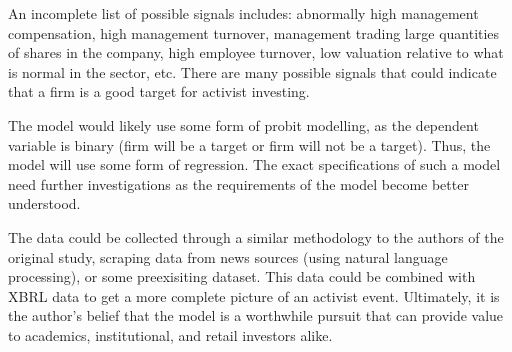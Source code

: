 \documentclass[11pt,a4paper]{article}
\begin{document}
An incomplete list of possible signals includes: abnormally high management
compensation, high management turnover, management trading large
quantities of shares in the company, high employee turnover, low valuation 
relative to what is normal in the sector, etc. There are many possible signals 
that could indicate that a firm is a good target for activist investing. 

The model would likely use some form of probit modelling, as the dependent 
variable is binary (firm will be a target or firm will not be a target). Thus,
the model will use some form of regression. The exact specifications of such a 
model need further investigations as the requirements of the model become 
better understood. 

The data could be collected through a similar methodology to the authors of the
original study\cite{BravEtAll}, scraping data from news sources (using natural 
language processing), or some preexisiting dataset. This data could be combined
with XBRL data to get a more complete picture of an activist event. 
Ultimately, it is the author's belief that the model is a worthwhile pursuit
that can provide value to academics, institutional, and retail investors alike.




\end{document}
